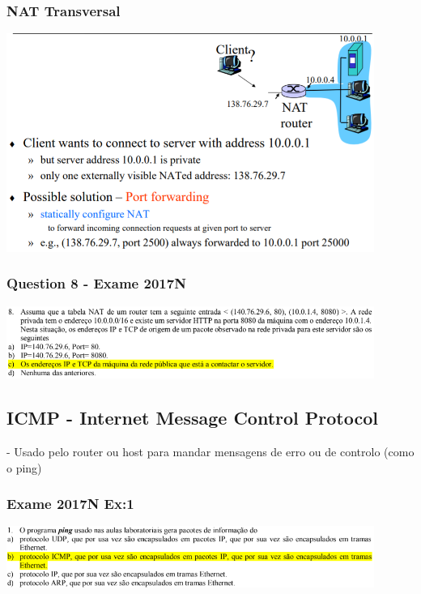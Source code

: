 \documentclass{article}
\begin{document}
\subsubsection{NAT Transversal}
\begin{center}
    \includegraphics[width=12cm]{images/RCOM29.png}
\end{center}

\subsubsection{Question 8 - Exame 2017N}
\begin{center}
    \includegraphics[width=12cm]{images/RCOM47.png}
\end{center}

\subsection{ICMP - Internet Message Control Protocol}

- Usado pelo router ou host para mandar mensagens de erro ou de controlo (como o ping)

\subsubsection{Exame 2017N Ex:1}
\begin{center}
    \includegraphics[width=12cm]{images/RCOM46.png}
\end{center}
\end{document}
